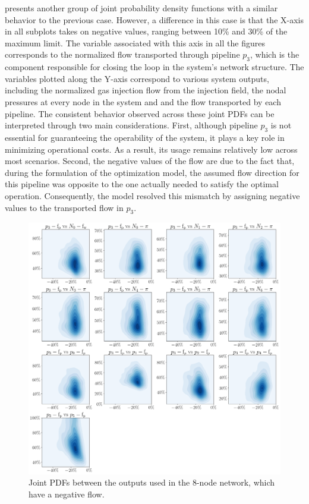  presents another group of joint probability density functions with a similar behavior to the previous case. However, a difference in this case is that the X-axis in all subplots takes on negative values, ranging between 10\% and 30\% of the maximum limit. The variable associated with this axis in all the figures corresponds to the normalized flow transported through pipeline $p_3$, which is the component responsible for closing the loop in the system’s network structure. The variables plotted along the Y-axis correspond to various system outputs, including the normalized gas injection flow from the injection field, the nodal pressures at every node in the system and and the flow transported by each pipeline. The consistent behavior observed across these joint PDFs can be interpreted through two main considerations. First, although pipeline $p_3$ is not essential for guaranteeing the operability of the system, it plays a key role in minimizing operational costs. As a result, its usage remains relatively low across most scenarios. Second, the negative values of the flow are due to the fact that, during the formulation of the optimization model, the assumed flow direction for this pipeline was opposite to the one actually needed to satisfy the optimal operation. Consequently, the model resolved this mismatch by assigning negative values to the transported flow in $p_3$.


\begin{figure}[htbp]
    \begin{center}
        \includegraphics[width=.7\textwidth]{figures/Chapter_NonLinealCensnet/outputs_outputs_2.png}
    \end{center}
    \caption{Joint PDFs between the outputs used in the 8-node network, which have a negative flow.}
    \label{fig:joint_distributions_output_output_2}
\end{figure}




